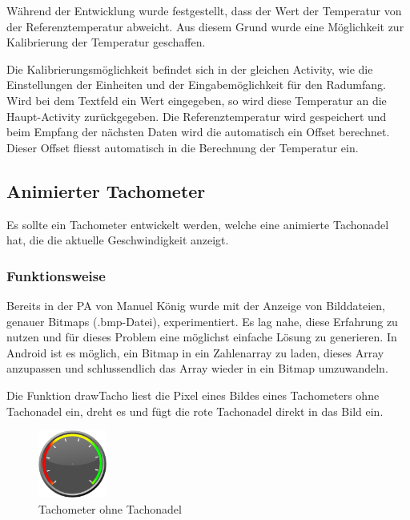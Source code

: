 Während der Entwicklung wurde festgestellt, dass der Wert der Temperatur von der Referenztemperatur abweicht. Aus diesem Grund wurde eine Möglichkeit zur Kalibrierung der Temperatur geschaffen.

Die Kalibrierungsmöglichkeit befindet sich in der gleichen Activity, wie die Einstellungen der Einheiten und der Eingabemöglichkeit für den Radumfang. Wird bei dem Textfeld ein Wert eingegeben, so wird diese Temperatur an die Haupt-Activity zurückgegeben. Die Referenztemperatur wird gespeichert und beim Empfang der nächsten Daten wird die automatisch ein Offset berechnet. Dieser Offset fliesst automatisch in die Berechnung der Temperatur ein.

\subsection{Animierter Tachometer}

Es sollte ein Tachometer entwickelt werden, welche eine animierte Tachonadel hat, die die aktuelle Geschwindigkeit anzeigt.

\subsubsection{Funktionsweise}

Bereits in der PA von Manuel König \cite{PA_koenigma} wurde mit der Anzeige von Bilddateien, genauer Bitmaps (.bmp-Datei), experimentiert. Es lag nahe, diese Erfahrung zu nutzen und für dieses Problem eine möglichst einfache Lösung zu generieren. In Android ist es möglich, ein Bitmap in ein Zahlenarray zu laden, dieses Array anzupassen und schlussendlich das Array wieder in ein Bitmap umzuwandeln.

Die Funktion drawTacho liest die Pixel eines Bildes eines Tachometers ohne Tachonadel ein, dreht es und fügt die rote Tachonadel direkt in das Bild ein.

\begin{figure}[ht]
    \includegraphics[width=0.2\textwidth]{3Vorgehen/imag/tachometer.png}
    \caption{Tachometer ohne Tachonadel}
	\label{tachometer} 
\end{figure}

